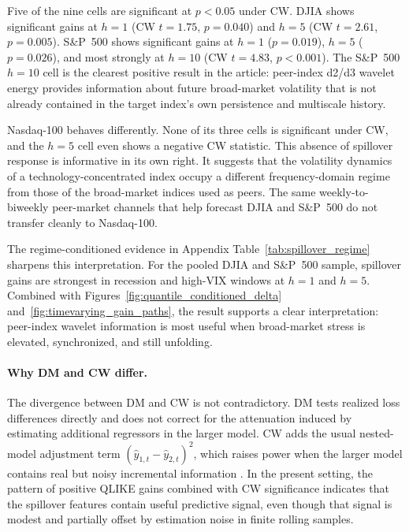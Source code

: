 Five of the nine cells are significant at \(p<0.05\) under CW. DJIA shows significant gains at \(h=1\) (CW \(t=1.75\), \(p=0.040\)) and \(h=5\) (CW \(t=2.61\), \(p=0.005\)). S\&P~500 shows significant gains at \(h=1\) (\(p=0.019\)), \(h=5\) (\(p=0.026\)), and most strongly at \(h=10\) (CW \(t=4.83\), \(p<0.001\)). The S\&P~500 \(h=10\) cell is the clearest positive result in the article: peer-index d2/d3 wavelet energy provides information about future broad-market volatility that is not already contained in the target index's own persistence and multiscale history.

Nasdaq-100 behaves differently. None of its three cells is significant under CW, and the \(h=5\) cell even shows a negative CW statistic. This absence of spillover response is informative in its own right. It suggests that the volatility dynamics of a technology-concentrated index occupy a different frequency-domain regime from those of the broad-market indices used as peers. The same weekly-to-biweekly peer-market channels that help forecast DJIA and S\&P~500 do not transfer cleanly to Nasdaq-100.

The regime-conditioned evidence in Appendix Table~\ref{tab:spillover_regime} sharpens this interpretation. For the pooled DJIA and S\&P~500 sample, spillover gains are strongest in recession and high-VIX windows at \(h=1\) and \(h=5\). Combined with Figures~\ref{fig:quantile_conditioned_delta} and~\ref{fig:timevarying_gain_paths}, the result supports a clear interpretation: peer-index wavelet information is most useful when broad-market stress is elevated, synchronized, and still unfolding.

\paragraph{Why DM and CW differ.}
The divergence between DM and CW is not contradictory. DM tests realized loss differences directly and does not correct for the attenuation induced by estimating additional regressors in the larger model. CW adds the usual nested-model adjustment term \((\hat y_{1,t}-\hat y_{2,t})^2\), which raises power when the larger model contains real but noisy incremental information \cite{clark2007nested}. In the present setting, the pattern of positive QLIKE gains combined with CW significance indicates that the spillover features contain useful predictive signal, even though that signal is modest and partially offset by estimation noise in finite rolling samples.

